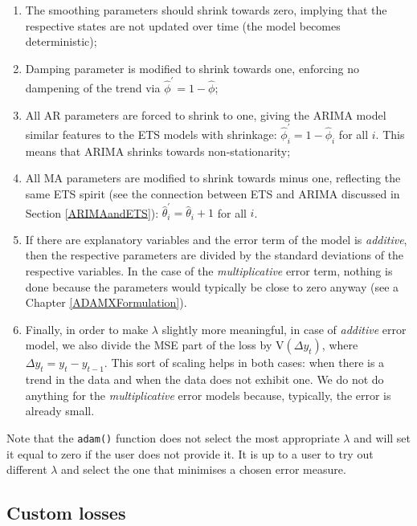 \documentclass[
]{book}
\providecommand{\tightlist}{%
  \setlength{\itemsep}{0pt}\setlength{\parskip}{0pt}}
\theoremstyle{definition}
\theoremstyle{definition}
\theoremstyle{definition}
\theoremstyle{definition}
\theoremstyle{remark}
\begin{document}
\begin{enumerate}
\def\labelenumi{\arabic{enumi}.}
\tightlist
\item
  The smoothing parameters should shrink towards zero, implying that the respective states are not updated over time (the model becomes deterministic);
\item
  Damping parameter is modified to shrink towards one, enforcing no dampening of the trend via \(\hat{\phi}^\prime=1-\hat{\phi}\);
\item
  All AR parameters are forced to shrink to one, giving the ARIMA model similar features to the ETS models with shrinkage: \(\hat{\phi}_i^\prime=1-\hat{\phi}_i\) for all \(i\). This means that ARIMA shrinks towards non-stationarity;
\item
  All MA parameters are modified to shrink towards minus one, reflecting the same ETS spirit (see the connection between ETS and ARIMA discussed in Section \ref{ARIMAandETS}): \(\hat{\theta}_i^\prime=\hat{\theta}_i+1\) for all \(i\).
\item
  If there are explanatory variables and the error term of the model is \emph{additive}, then the respective parameters are divided by the standard deviations of the respective variables. In the case of the \emph{multiplicative} error term, nothing is done because the parameters would typically be close to zero anyway (see a Chapter \ref{ADAMXFormulation}).
\item
  Finally, in order to make \(\lambda\) slightly more meaningful, in case of \emph{additive} error model, we also divide the MSE part of the loss by \(\mathrm{V}\left({\Delta}y_t\right)\), where \({\Delta}y_t=y_t-y_{t-1}\). This sort of scaling helps in both cases: when there is a trend in the data and when the data does not exhibit one. We do not do anything for the \emph{multiplicative} error models because, typically, the error is already small.
\end{enumerate}

Note that the \texttt{adam()} function does not select the most appropriate \(\lambda\) and will set it equal to zero if the user does not provide it. It is up to a user to try out different \(\lambda\) and select the one that minimises a chosen error measure.

\hypertarget{custom-losses}{%
\subsection{Custom losses}\label{custom-losses}}
\end{document}
